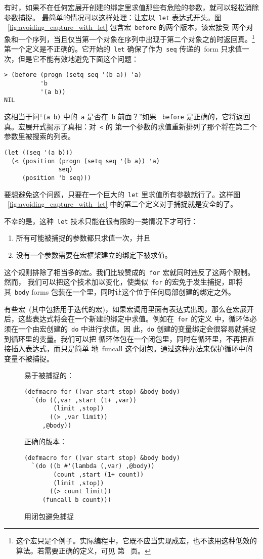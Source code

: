 有时，如果不在任何宏展开创建的绑定里求值那些有危险的参数，就可以轻松消除参数捕捉。
最简单的情况可以这样处理：让宏以~\texttt{let} 表达式开头。图
~\ref{fig:avoiding_capture_with_let} 包含宏~\texttt{before} 的两个版本，该宏接受
两个对象和一个序列，当且仅当第一个对象在序列中出现于第二个对象之前时返回真。\footnote{%
这个宏只是个例子。实际编程中，它既不应当实现成宏，也不该用这种低效的算法。若需要正确的定义，可见
第~\pageref{fig:functions_which_search_lists} 页。}
第一个定义是不正确的。它开始的~\texttt{let} 确保了作为~\texttt{seq} 传递的~form
只求值一次，但是它不能有效地避免下面这个问题：
\begin{lstlisting}
> (before (progn (setq seq '(b a)) 'a)
          'b
          '(a b))
NIL
\end{lstlisting}
这相当于问“\texttt{(a b)} 中的~\verb|a| 是否在~\verb|b| 前面？”如果
~\verb|before| 是正确的，它将返回真。宏展开式揭示了真相：对~\verb|<| 的
第一个参数的求值重新排列了那个将在第二个参数里被搜索的列表。
\begin{lstlisting}
(let ((seq '(a b)))
  (< (position (progn (setq seq '(b a)) 'a)
               seq)
     (position 'b seq)))
\end{lstlisting}
要想避免这个问题，只要在一个巨大的~\texttt{let} 里求值所有参数就行了。这样图
~\ref{fig:avoiding_capture_with_let} 中的第二个定义对于捕捉就是安全的了。

不幸的是，这种~\texttt{let} 技术只能在很有限的一类情况下才可行：
\begin{enumerate}
\item 所有可能被捕捉的参数都只求值一次，并且
\item 没有一个参数需要在宏框架建立的绑定下被求值。
\end{enumerate}
这个规则排除了相当多的宏。我们比较赞成的~\texttt{for} 宏就同时违反了这两个限制。然而，
我们可以把这个技术加以变化，使类似~\texttt{for} 的宏免于发生捕捉，即将其~\texttt{body} forms 
包装在一个\lexpr{}里，同时让这个\lexpr{}位于任何局部创建的绑定之外。

有些宏~(其中包括用于迭代的宏)，如果宏调用里面有表达式出现，那么在宏展开
后，这些表达式将会在一个新建的绑定中求值。例如在~\texttt{for} 的定义
中，循环体必须在一个由宏创建的~\texttt{do} 中进行求值。因
此，\texttt{do} 创建的变量绑定会很容易就捕捉到循环里的变量。我们可以把
循环体包在一个闭包里，同时在循环里，不再把直接插入表达式，而只是简单
地~funcall 这个闭包。通过这种办法来保护循环中的变量不被捕捉。

\begin{figure}
易于被捕捉的：
\begin{lstlisting}
(defmacro for ((var start stop) &body body)
  `(do ((,var ,start (1+ ,var))
        (limit ,stop))
       ((> ,var limit))
     ,@body))
\end{lstlisting}
正确的版本：
\begin{lstlisting}
(defmacro for ((var start stop) &body body)
  `(do ((b #'(lambda (,var) ,@body))
        (count ,start (1+ count))
        (limit ,stop))
       ((> count limit))
     (funcall b count)))
\end{lstlisting}
  \caption{用闭包避免捕捉}
  \label{fig:avoiding_capture_with_closure}
\end{figure}

